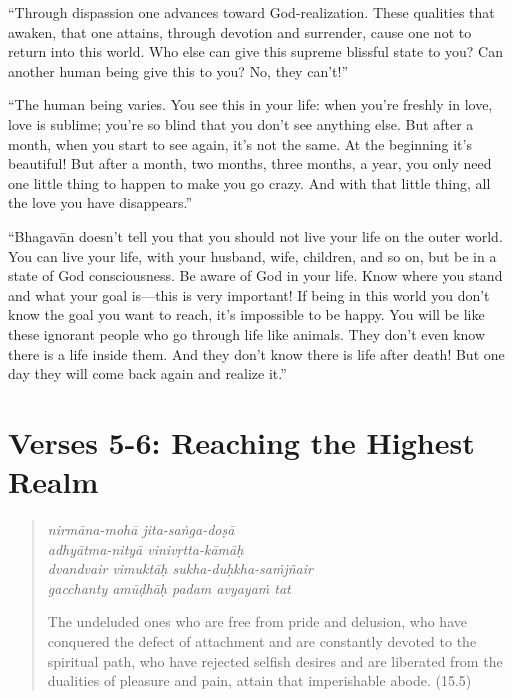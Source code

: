 \documentclass[12pt, twoside, openright]{memoir}
\begin{document}
\enquote{Through dispassion one advances toward God-realization. These qualities that awaken, that one attains, through devotion and surrender, cause one not to return into this world. Who else can give this supreme blissful state to you? Can another human being give this to you? No, they can’t!}

\enquote{The human being varies. You see this in your life: when you’re freshly in love, love is sublime; you’re so blind that you don’t see anything else. But after a month, when you start to see again, it’s not the same. At the beginning it’s beautiful! But after a month, two months, three months, a year, you only need one little thing to happen to make you go crazy. And with that little thing, all the love you have disappears.}

\enquote{Bhagavān doesn’t tell you that you should not live your life on the outer world. You can live your life, with your husband, wife, children, and so on, but be in a state of God consciousness. Be aware of God in your life. Know where you stand and what your goal is---this is very important! If being in this world you don’t know the goal you want to reach, it’s impossible to be happy. You will be like these ignorant people who go through life like animals. They don’t even know there is a life inside them. And they don’t know there is life after death! But one day they will come back again and realize it.}


\section{Verses 5-6: Reaching the Highest Realm}\label{sec-verses-5-6-reaching-the-highest-realm}


\par
\begin{verse}
\textit{nirmāna-mohā jita-saṅga-doṣā} \\
\textit{adhyātma-nityā vinivṛtta-kāmāḥ} \\
\textit{dvandvair vimuktāḥ sukha-duḥkha-saṁjñair} \\
\textit{gacchanty amūḍhāḥ padam avyayaṁ tat}

\noindent The undeluded ones who are free from pride and delusion, who have conquered the defect of attachment and are constantly devoted to the spiritual path, who have rejected selfish desires and are liberated from the dualities of pleasure and pain, attain that imperishable abode. (15.5)
\end{verse}
\par
\end{document}

